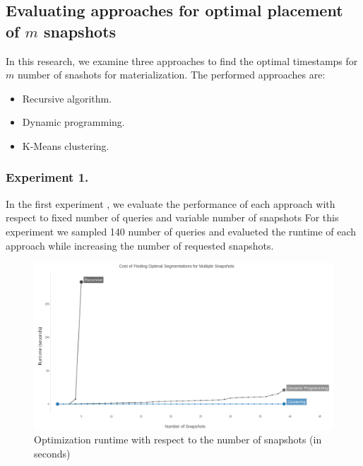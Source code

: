 		\subsection{Evaluating approaches for optimal placement of $m$ snapshots} \label{sec:evaluating_approaches}
			 In this research, we examine three approaches to find the optimal timestamps for $m$ number of snashots for materialization. The performed approaches are:
			\begin{itemize}
				\item Recursive algorithm.
				\item Dynamic programming.
				\item K-Means clustering.
			\end{itemize}
			\subsubsection {Experiment 1.} \label{sec:experiment_1}
			In the first experiment , we evaluate the performance of each approach with respect to fixed number of queries and variable number of snapshots For this experiment we sampled 140 number of queries and evalueted the runtime of each approach while increasing the number of requested snapshots.

			\begin{figure}
				\centering
				\includegraphics[width=\textwidth]{figs/variable_snapshots.jpg}
				\caption{Optimization runtime with respect to the number of snapshots (in seconds)}
				\label{fig:variable_snapshots}
			\end{figure} 

